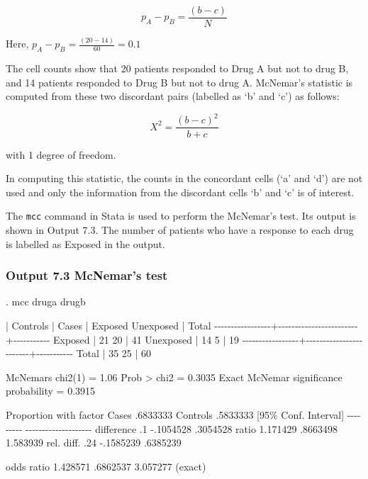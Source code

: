 \documentclass[
]{memoir}
\newenvironment{Shaded}{\begin{snugshade}}{\end{snugshade}}
\newcommand{\NormalTok}[1]{#1}
\begin{document}
\[ p_{A} - p_{B} = \frac{(b - c)}{N} \]

Here, \(p_{A} - p_{B} = \frac{(20 - 14)}{60} = 0.1\)

The cell counts show that 20 patients responded to Drug A but not to drug B, and 14 patients responded to Drug B but not to drug A. McNemar's statistic is computed from these two discordant pairs (labelled as `b' and `c') as follows:

\[ X^2 = \frac{(b-c)^2}{b+c} \]

with 1 degree of freedom.

In computing this statistic, the counts in the concordant cells (`a' and `d') are not used and only the information from the discordant cells `b' and `c' is of interest.

The \texttt{mcc} command in Stata is used to perform the McNemar's test. Its output is shown in Output 7.3. The number of patients who have a response to each drug is labelled as Exposed in the output.

\hypertarget{output-7.3-mcnemars-test}{%
\subsubsection{Output 7.3 McNemar's test}\label{output-7.3-mcnemars-test}}

\begin{Shaded}
\begin{Highlighting}[]
\NormalTok{. mcc druga drugb}

\NormalTok{                 |        Controls        |}
\NormalTok{Cases            |   Exposed   Unexposed  |      Total}
\NormalTok{{-}{-}{-}{-}{-}{-}{-}{-}{-}{-}{-}{-}{-}{-}{-}{-}{-}+{-}{-}{-}{-}{-}{-}{-}{-}{-}{-}{-}{-}{-}{-}{-}{-}{-}{-}{-}{-}{-}{-}{-}{-}+{-}{-}{-}{-}{-}{-}{-}{-}{-}{-}{-}}
\NormalTok{         Exposed |        21          20  |         41}
\NormalTok{       Unexposed |        14           5  |         19}
\NormalTok{{-}{-}{-}{-}{-}{-}{-}{-}{-}{-}{-}{-}{-}{-}{-}{-}{-}+{-}{-}{-}{-}{-}{-}{-}{-}{-}{-}{-}{-}{-}{-}{-}{-}{-}{-}{-}{-}{-}{-}{-}{-}+{-}{-}{-}{-}{-}{-}{-}{-}{-}{-}{-}}
\NormalTok{           Total |        35          25  |         60}

\NormalTok{McNemar\textquotesingle{}s chi2(1) =      1.06    Prob \textgreater{} chi2 = 0.3035}
\NormalTok{Exact McNemar significance probability       = 0.3915}

\NormalTok{Proportion with factor}
\NormalTok{        Cases       .6833333}
\NormalTok{        Controls    .5833333     [95\% Conf. Interval]}
\NormalTok{                   {-}{-}{-}{-}{-}{-}{-}{-}{-}     {-}{-}{-}{-}{-}{-}{-}{-}{-}{-}{-}{-}{-}{-}{-}{-}{-}{-}{-}{-}}
\NormalTok{        difference        .1     {-}.1054528   .3054528}
\NormalTok{        ratio       1.171429      .8663498   1.583939}
\NormalTok{        rel. diff.       .24     {-}.1585239   .6385239}

\NormalTok{        odds ratio  1.428571      .6862537   3.057277   (exact)}
\end{Highlighting}
\end{Shaded}
\end{document}
